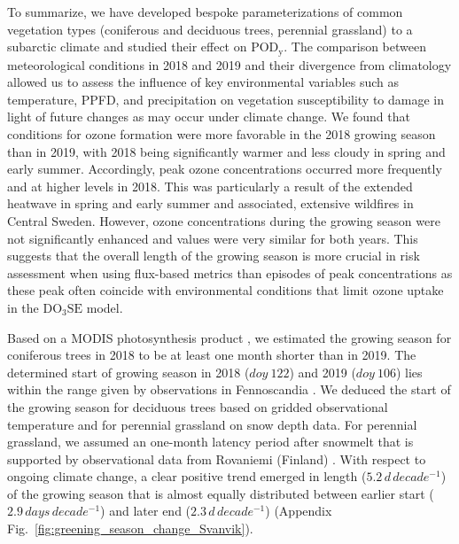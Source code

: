 \documentclass[bg, manuscript]{copernicus}
\begin{document}
\label{sec:conc}

To summarize, we have developed bespoke parameterizations of common vegetation types (coniferous and deciduous trees, perennial grassland) to a subarctic climate and studied their effect on $\mathrm{POD_y}$. The comparison between meteorological conditions in 2018 and 2019 and their divergence from climatology allowed us to assess the influence of key environmental variables such as temperature, PPFD, and precipitation on vegetation susceptibility to  damage in light of future changes as may occur under climate change. We found that conditions for ozone formation were more favorable in the 2018 growing season than in 2019, with 2018 being significantly warmer and less cloudy in spring and early summer. Accordingly, peak ozone concentrations occurred more frequently and at higher levels in 2018. This was particularly a result of the extended heatwave in spring and early summer and associated, extensive wildfires in Central Sweden. However, ozone concentrations during the growing season were not significantly enhanced and  values were very similar for both years.
This suggests that the overall length of the growing season is more crucial in risk assessment when using flux-based metrics than episodes of peak concentrations as these peak \chem{[O_3]} often coincide with environmental conditions that limit ozone uptake in the $\mathrm{DO_3SE}$ model.

Based on a MODIS photosynthesis product \citep{MODIS_PSN}, we estimated the growing season for coniferous trees in 2018 to be at least one month shorter than in 2019. The determined start of growing season in 2018 ($\unit{doy}~122$) and 2019 ($\unit{doy}~106$) lies within the range given by observations in Fennoscandia \citep{TB:Kolari2007,IVL:Karlsson2018}. We deduced the start of the growing season for deciduous trees based on gridded observational temperature and for perennial grassland on snow depth data. For perennial grassland, we assumed an one-month latency period after snowmelt that is supported by observational data from Rovaniemi (Finland) \citep{FCR:Korhonen2018}. With respect to ongoing climate change, a clear positive trend emerged in length ($5.2\,\unit{d\,decade^{-1}}$) of the growing season that is almost equally distributed between earlier start ($2.9\,\unit{days\,decade^{-1}}$) and later end ($2.3\,\unit{d\,decade^{-1}}$) (Appendix Fig.~\ref{fig:greening_season_change_Svanvik}).
\end{document}
